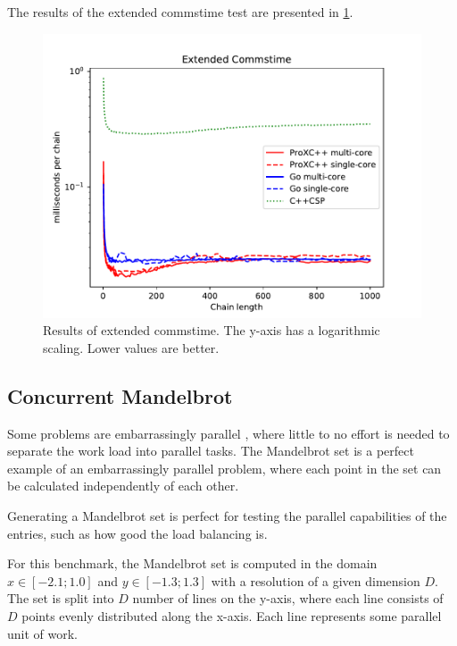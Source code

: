 The results of the extended commstime test are presented in \cref{fig:extended_commstime}.

\begin{figure}[h!]
    \centering
    \includegraphics[width=0.9\linewidth]{fig/extended_commstime}
    \caption{Results of extended commstime. The y\hyp{}axis has a logarithmic scaling. Lower values are better.}
    \label{fig:extended_commstime}
\end{figure}


\FloatBarrier
\subsection{Concurrent Mandelbrot}
\label{subsec:concurrent_mandelbrot_test}


Some problems are embarrassingly parallel \citep{wilkinson1999parallel}, where little to no effort is needed to separate the work load into parallel tasks. The Mandelbrot set is a perfect example of an embarrassingly parallel problem, where each point in the set can be calculated independently of each other.

Generating a Mandelbrot set is perfect for testing the parallel capabilities of the entries, such as how good the load balancing is.

For this benchmark, the Mandelbrot set is computed in the domain $x\in[-2.1;1.0]$ and $y\in[-1.3;1.3]$ with a resolution of a given dimension $D$. The set is split into $D$ number of lines on the y\hyp{}axis, where each line consists of $D$ points evenly distributed along the x\hyp{}axis. Each line represents some parallel unit of work.

